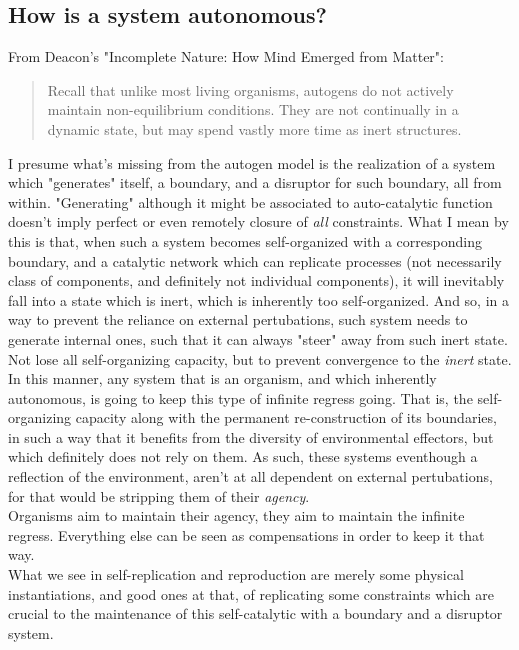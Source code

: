 \documentclass[a4paper,12pt,twoside,leqno]{article}
\begin{document}
\subsection*{How is a system autonomous?}
From Deacon's "Incomplete Nature: How Mind Emerged from Matter":
\begin{quotation}
Recall that unlike most living organisms, autogens do not
actively maintain non-equilibrium conditions. They are not continually in a dynamic state, but may spend vastly more time as inert structures.
\end{quotation}
I presume what's missing from the autogen model is the realization of a system which "generates" itself, a boundary, and a disruptor for such boundary, all from within. "Generating" although it might be associated to auto-catalytic function doesn't imply perfect or even remotely closure of \textit{all} constraints. What I mean by this is that, when such a system becomes self-organized with a corresponding boundary, and a catalytic network which can replicate processes (not necessarily class of components, and definitely not individual components), it will inevitably fall into a state which is inert, which is inherently too self-organized. And so, in a way to prevent the reliance on external pertubations, such system needs to generate internal ones, such that it can always "steer" away from such inert state. Not lose all self-organizing capacity, but to prevent convergence to the \textit{inert} state. In this manner, any system that is an organism, and which inherently autonomous, is going to keep this type of infinite regress going. That is, the self-organizing capacity along with the permanent re-construction of its boundaries, in such a way that it benefits from the diversity of environmental effectors, but which definitely does not rely on them. As such, these systems eventhough a reflection of the environment, aren't at all dependent on external pertubations, for that would be stripping them of their \textit{agency}.\\
Organisms aim to maintain their agency, they aim to maintain the infinite regress. Everything else can be seen as compensations in order to keep it that way.\\
What we see in self-replication and reproduction are merely some physical instantiations, and good ones at that, of replicating some constraints which are crucial to the maintenance of this self-catalytic with a boundary and a disruptor system.
\end{document}
